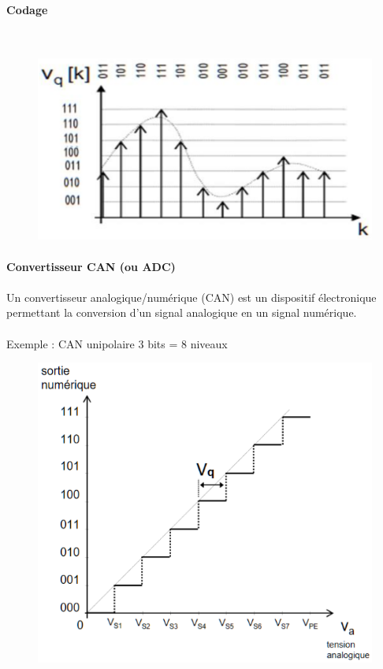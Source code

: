 \documentclass{article}
\begin{document}
\paragraph{Codage}\
\begin{figure}[H]
    \centering
    \includegraphics[width=.5\linewidth]{images/codage.png}
\end{figure}

\paragraph{Convertisseur CAN (ou ADC)}
\paragraph{}
Un convertisseur analogique/numérique (CAN) est un dispositif électronique permettant la conversion d'un signal analogique en un signal numérique.

\newpage
\paragraph{}
Exemple : CAN unipolaire 3 bits = 8 niveaux
\begin{figure}[H]
    \centering
    \includegraphics[width=.5\linewidth]{images/CAN-3bits.png}
\end{figure}
\end{document}
